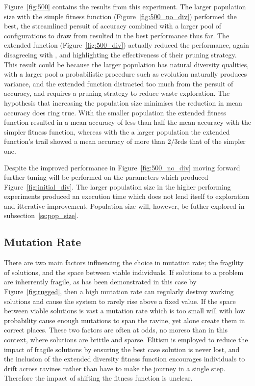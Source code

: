 Figure~\ref{fig:500} contains the results from this experiment. The larger
population size with the simple fitness function (Figure~\ref{fig:500_no_div})
performed the best, the
streamlined persuit of accuracy combined with a larger pool of configurations to
draw from resulted in the best performance thus far.  The extended function
(Figure~\ref{fig:500_div})
actually reduced the performance, again disagreeing with
\cite{deJong:2001:RBP:2955239.2955241}, and highlighting the
effectiveness of their pruning strategy. This result could be because
the larger population has natural diversity qualities, with a larger pool
a probabilistic procedure such as evolution naturally produces variance,
and the extended
function distracted too much from the persuit of accuracy, and requires a pruning
strategy to reduce waste exploration. The hypothesis
that increasing the population size minimises the reduction in mean accuracy
does ring true. With the smaller population the extended fitness function resulted in
a mean accuracy of less than half the mean accuracy with the simpler fitness function,
whereas
with the a larger population the extended function's trail showed a mean accuracy of
more than
$2/3$rds that of the simpler one.

Despite the improved performance in Figure~\ref{fig:500_no_div} moving forward
further tuning will be performed on the parameters which produced
Figure~\ref{fig:initial_div}. The larger population size in the higher performing experiments
produced an execution time which does not lend itself to exploration and
itterative improvement. Population size will, however, be futher explored in
subsection~\ref{ss:pop_size}.

\subsection{Mutation Rate}

There are two main factors influencing the choice in mutation rate; the fragility
of solutions, and the space between viable individuals. If solutions to a problem are
inherrently fragile, as has been demonstrated in this case by Figure~\ref{fig:rugged},
then a high
mutation rate can regularly destroy working solutions and cause the system to
rarely rise above a fixed value. If the space between viable solutions is vast
a mutation rate which is too small will with low probability cause enough mutations to
span the ravine, yet alone create them in correct places. These two factors are
often at odds, no moreso than in this context, where solutions are brittle and
sparse. Elitism is employed to reduce the impact of fragile solutions by ensuring
the best case solution is never lost, and the inclusion of the extended diversity
fitness function encourages individuals to drift across ravines rather than have
to make the journey in a single step. Therefore the impact of shifting the
fitness function is unclear.

